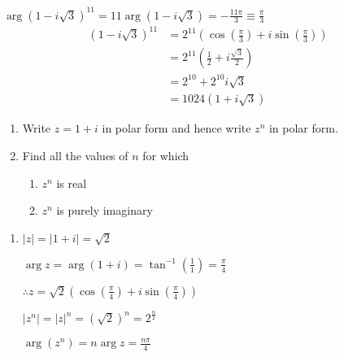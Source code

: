 \documentclass[11pt,a4paper]{book}
\begin{document}
\begin{example}
\begin{enumerate}[label=(\alph*)]
${\displaystyle \arg\left(1-i\sqrt{3}\right)^{11}=11\arg\left(1-i\sqrt{3}\right)=-\frac{11\pi}{3}\equiv\frac{\pi}{3}}$
\begin{align*}
\left(1-i\sqrt{3}\right)^{11} & =2^{11}\left(\cos\left(\frac{\pi}{3}\right)+i\sin\left(\frac{\pi}{3}\right)\right)\\
 & =2^{11}\left(\frac{1}{2}+i\frac{\sqrt{3}}{2}\right)\\
 & =2^{10}+2^{10}i\sqrt{3}\\
 & =1024\left(1+i\sqrt{3}\right)
\end{align*}

\end{enumerate}

\end{example}

\begin{example}

\begin{enumerate}[label=(\alph*)]

\item Write $z=1+i$ in polar form and hence write $z^{n}$ in polar
form.

\item Find all the values of $n$ for which

\begin{enumerate}[label=(\roman*)]

\item  $z^{n}$ is real

\item  $z^{n}$ is purely imaginary

\end{enumerate}

\end{enumerate}

\Solution

\begin{enumerate}[label=(\alph*)]

\item $\left|z\right|=\left|1+i\right|=\sqrt{2}$

${\displaystyle \arg z=\arg\left(1+i\right)=\tan^{-1}\left(\frac{1}{1}\right)=\frac{\pi}{4}}$

${\displaystyle \therefore z=\sqrt{2}\left(\cos\left(\frac{\pi}{4}\right)+i\sin\left(\frac{\pi}{4}\right)\right)}$

${\displaystyle \left|z^{n}\right|=\left|z\right|^{n}=\left(\sqrt{2}\right)^{n}=2^{\frac{n}{2}}}$

${\displaystyle \arg\left(z^{n}\right)=n\arg z=\frac{n\pi}{4}}$


\end{enumerate}
\end{example}
\end{document}
